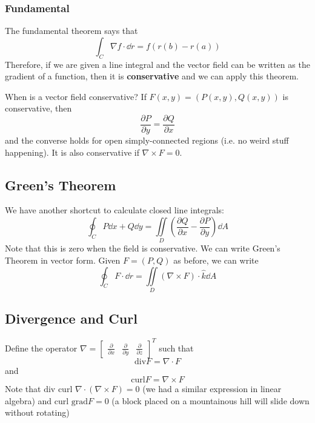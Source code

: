 \documentclass{article}
\begin{document}
\subsubsection*{Fundamental }
The fundamental theorem says that 
\begin{equation}
    \int_C \nabla f \cdot \dd{r} = f(r(b)-r(a))
\end{equation}
Therefore, if we are given a line integral and the vector field can be written as the gradient of a function, then it is \textbf{conservative} and we can apply this theorem.

When is a vector field conservative? If $F(x,y) = (P(x,y), Q(x,y))$ is conservative, then
\begin{equation}
    \frac{\partial P}{\partial y}= \frac{\partial Q}{\partial x}
\end{equation}
and the converse holds for open simply-connected regions (i.e. no weird stuff happening). It is also conservative if $\nabla \times F = 0$.
\subsection{Green's Theorem}
We have another shortcut to calculate closed line integrals:
\begin{equation}
    \oint_C P \dd{x} + Q \dd{y} = \iint\limits_D \left(\frac{\partial Q}{\partial x}-\frac{\partial P}{\partial y}\right)\dd{A}
\end{equation}
Note that this is zero when the field is conservative. We can write Green's Theorem in vector form. Given $F = (P,Q)$ as before, we can write 
\begin{equation}
    \oint_C F\cdot \dd{r} = \iint\limits_D (\nabla \times F) \cdot \hat{k} \dd{A}
\end{equation}
\subsection{Divergence and Curl}
Define the operator $\nabla = \begin{bmatrix}
    \frac{\partial}{\partial x} & \frac{\partial}{\partial y} & \frac{\partial}{\partial z}
\end{bmatrix}^T$ such that 
\begin{equation}
    \text{div}F = \nabla \cdot F
\end{equation}
and
\begin{equation}
    \text{curl} F = \nabla \times F
\end{equation}
Note that $\text{div curl } \nabla \cdot (\nabla \times F)= 0$ (we had a similar expression in linear algebra) and $\text{curl grad} F = 0$ (a block placed on a mountainous hill will slide down without rotating)
\end{document}
